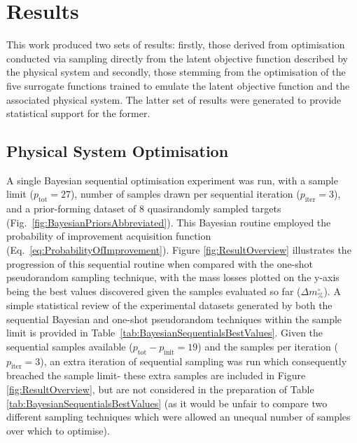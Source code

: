 \section{Results}
This work produced two sets of results: firstly, those derived from
 optimisation conducted via sampling directly from the latent objective
 function described by the physical system and secondly, those stemming
from the optimisation of the five surrogate functions trained to emulate 
 the latent objective function and the associated physical system.
The latter set of results were generated to provide statistical support for
 the former.

\subsection{Physical System Optimisation}
A single Bayesian sequential optimisation experiment
 was run, with a sample limit (\(p_{\text{tot}}=27\)), number of samples
 drawn per sequential iteration (\(p_{\text{iter}}=3\)), and a prior-forming
 dataset of 8 quasirandomly sampled targets 
 (Fig.~\ref{fig:BayesianPriorsAbbreviated}).
This Bayesian routine employed the probability of improvement acquisition
 function (Eq.~\ref{eq:ProbabilityOfImprovement}).
Figure \ref{fig:ResultOverview} illustrates the progression of this
 sequential routine when compared with the one-shot pseudorandom
 sampling technique, with the mass losses plotted on the y-axis being
 the best values discovered given the samples evaluated so far
 (\(\Delta m_{\%}^{\circ}\)).
A simple statistical review of the experimental datasets generated by 
 both the sequential Bayesian and one-shot pseudorandom techniques within
 the sample limit is provided in Table~\ref{tab:BayesianSequentialsBestValues}.
Given the sequential samples available (\(p_{\text{tot}}-p_{\text{init}}=19\))
 and the samples per iteration (\(p_{\text{iter}}=3\)), an extra iteration of 
 sequential sampling was run which consequently breached the sample limit-
 these extra samples are included in Figure \ref{fig:ResultOverview}, but
 are not considered in the preparation of Table 
 \ref{tab:BayesianSequentialsBestValues} (as it would be unfair to compare
 two different sampling techniques which were allowed an unequal number of
 samples over which to optimise).

